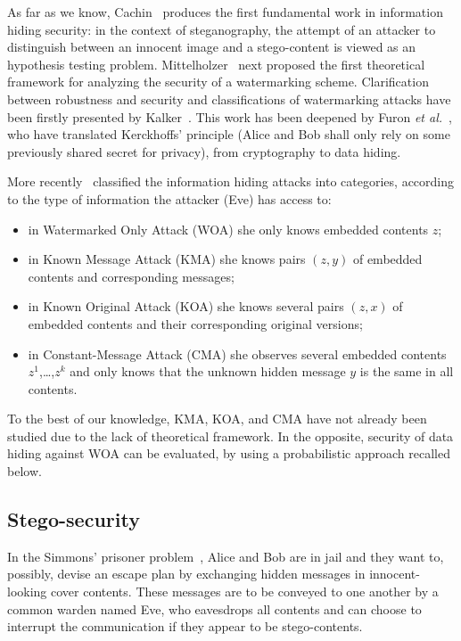 \documentclass{comjnl}
\begin{document}
As far as we know, Cachin~\cite{Cachin2004}
produces the first fundamental work in information hiding security:
in the context of steganography, the attempt of an attacker to distinguish 
between an innocent image and a stego-content is viewed as an hypothesis 
testing problem.
Mittelholzer~\cite{Mittelholzer99} next proposed the first theoretical 
framework for analyzing the security of a watermarking scheme.
Clarification between  robustness and security 
and classifications of watermarking attacks
have been firstly presented by Kalker~\cite{Kalker2001}.
This work has been deepened by Furon \emph{et al.}~\cite{Furon2002}, who have translated Kerckhoffs' principle (Alice and Bob shall only rely on some previously shared secret for privacy), from cryptography to data hiding. 

More recently~\cite{Cayre2005,Perez06} classified the information hiding  
attacks into categories, according to the type of information the attacker (Eve)
has access to:
\begin{itemize}
\item in Watermarked Only Attack (WOA) she only knows embedded contents $z$;
\item in Known Message Attack (KMA) she knows pairs $(z,y)$ of embedded
  contents and corresponding messages;
\item in Known Original Attack (KOA) she knows several pairs $(z,x)$ 
  of embedded contents and their corresponding original versions;
\item in Constant-Message Attack (CMA) she observes several embedded
  contents $z^1$,\ldots,$z^k$ and only knows that the unknown 
  hidden message $y$ is the same in all contents.
\end{itemize}

To the best of our knowledge, 
KMA, KOA, and CMA have not already been studied
due to the lack of theoretical framework.
In the opposite, security of data hiding against WOA can be evaluated,
by using a probabilistic approach recalled below.




\subsection{Stego-security}\label{sub:stegosecurity}


In the Simmons' prisoner problem~\cite{Simmons83}, Alice and Bob are in jail and
they want to,  possibly, devise an escape plan by  exchanging hidden messages in
innocent-looking  cover contents.  These  messages  are to  be  conveyed to  one
another by a common warden named Eve, who eavesdrops all contents and can choose
to interrupt the communication if they appear to be stego-contents.
\end{document}
